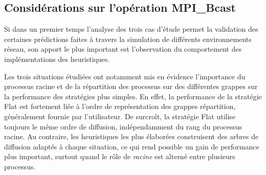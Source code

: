 %
%
%
%
%	
%	
%
%

\subsection{Considérations sur l'opération MPI\_Bcast }

Si dans un premier temps l'analyse des trois cas d'étude permet la
validation des certaines prédictions faites à travers la simulation
de différents environnements réseau, son apport le plus important
est l'observation du comportement des implémentations des heuristiques. 

Les trois situations étudiées ont notamment mis en évidence l'importance
du processus racine et de la répartition des processus sur des différentes
grappes sur la performance des stratégies plus simples. En effet,
la performance de la stratégie Flat est fortement liée à l'ordre de
représentation des grappes répartition, généralement fournie par l'utilisateur.
De surcroît, la stratégie Flat utilise toujours le même ordre de diffusion,
indépendamment du rang du processus racine. Au contraire, les heuristiques
les plus élaborées construisent des arbres de diffusion adaptés à
chaque situation, ce qui rend possible un gain de performance plus
important, surtout quand le rôle de \emph{racine} est alterné entre
plusieurs processus.


